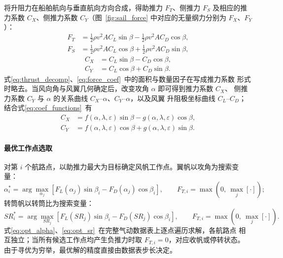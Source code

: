 \documentclass[UTF8,a4paper,twoside,zihao=5,fontset=windows]{ctexart}
\begin{document}
将升阻力在船舶航向与垂直航向方向合成，得助推力 $F_T$、侧推力 $F_S$ 及相应的推力系数
$C_X$、侧推力系数 $C_Y$（图~\ref{fig:sail_force} 中对应的无量纲力分别为 $F_X$、$F_Y$）：
\begin{equation}
\begin{aligned}
F_T&=\frac{1}{2}\rho v^2AC_L\sin\beta-\frac{1}{2}\rho v^2AC_D\cos\beta,\\
F_S&=\frac{1}{2}\rho v^2AC_L\cos\beta+\frac{1}{2}\rho v^2AC_D\sin\beta,
\end{aligned}
\label{eq:thrust_decomp}
\end{equation}
\begin{equation}
\begin{aligned}
C_X&=C_L\sin\beta-C_D\cos\beta,\\
C_Y&=C_L\cos\beta+C_D\sin\beta .
\end{aligned}
\label{eq:force_coef}
\end{equation}
式\eqref{eq:thrust_decomp}、\eqref{eq:force_coef}~中的面积与数量因子在写成推力系数
形式时略去。当风向角与风翼几何确定后，改变攻角 $\alpha$ 即可得到推力系数 $C_X$、
侧推力系数 $C_Y$ 与 $\alpha$ 的关系曲线 $C_X$--$\alpha$、$C_Y$--$\alpha$，以及风翼
升阻极坐标曲线 $C_L$--$C_D$；结合式\eqref{eq:coef_functions}~有
\begin{equation}
\begin{aligned}
C_X&=f\!\left(\alpha,\lambda,\varepsilon\right)\sin\beta
     -g\!\left(\alpha,\lambda,\varepsilon\right)\cos\beta,\\
C_Y&=f\!\left(\alpha,\lambda,\varepsilon\right)\cos\beta
     +g\!\left(\alpha,\lambda,\varepsilon\right)\sin\beta .
\end{aligned}
\label{eq:force_coef_alpha}
\end{equation}


\paragraph{最优工作点选取}
对第 $i$ 个航路点，以助推力最大为目标确定风帆工作点。翼帆以攻角为搜索变量：
\begin{equation}
\alpha_i^{*}=\arg\max_{\alpha_j}
\left[F_L\!\left(\alpha_j\right)\sin\beta_i-F_D\!\left(\alpha_j\right)\cos\beta_i\right],
\qquad
F_{T,i}=\max\!\left(0,\ \max_j\left[\cdot\right]\right);
\label{eq:opt_alpha}
\end{equation}
转筒帆以转筒比为搜索变量：
\begin{equation}
SR_i^{*}=\arg\max_{SR_j}
\left[F_L\!\left(SR_j\right)\sin\beta_i-F_D\!\left(SR_j\right)\cos\beta_i\right],
\qquad
F_{T,i}=\max\!\left(0,\ \max_j\left[\cdot\right]\right).
\label{eq:opt_sr}
\end{equation}
式\eqref{eq:opt_alpha}、\eqref{eq:opt_sr}~在完整气动数据表上逐点遍历求解，各航路点
相互独立；当所有候选工作点均产生负推力时取 $F_{T,i}=0$，对应收帆或停转状态。
由于寻优为穷举，最优解的精度直接由数据表步长决定。
\end{document}
